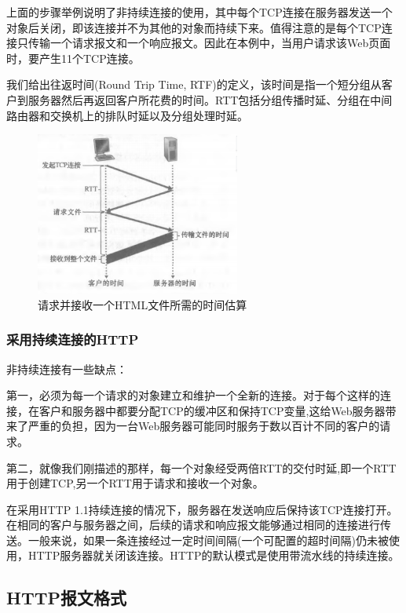     上面的步骤举例说明了非持续连接的使用，其中每个TCP连接在服务器发送一个对象后关闭，即该连接并不为其他的对象而持续下来。值得注意的是每个TCP连接只传输一个请求报文和一个响应报文。因此在本例中，当用户请求该Web页面时，要产生11个TCP连接。

    我们给出往返时间(Round Trip Time, RTF)的定义，该时间是指一个短分组从客户到服务器然后再返回客户所花费的时间。RTT包括分组传播时延、分组在中间路由器和交换机上的排队时延以及分组处理时延。

\begin{figure}[!htbp]
    \centering
    \includegraphics[width=0.6\textwidth]{image/chapter02/RTT.png}
    \caption{请求并接收一个HTML文件所需的时间估算}
\end{figure}

\subsubsection{采用持续连接的HTTP}

    非持续连接有一些缺点：
    
    第一，必须为每一个请求的对象建立和维护一个全新的连接。对于每个这样的连接，在客户和服务器中都要分配TCP的缓冲区和保持TCP变量,这给Web服务器带来了严重的负担，因为一台Web服务器可能同时服务于数以百计不同的客户的请求。

    第二，就像我们刚描述的那样，每一个对象经受两倍RTT的交付时延,即一个RTT用于创建TCP,另一个RTT用于请求和接收一个对象。

    在采用HTTP 1.1持续连接的情况下，服务器在发送响应后保持该TCP连接打开。在相同的客户与服务器之间，后续的请求和响应报文能够通过相同的连接进行传送。一般来说，如果一条连接经过一定时间间隔(一个可配置的超时间隔)仍未被使用，HTTP服务器就关闭该连接。HTTP的默认模式是使用带流水线的持续连接。

\subsection{HTTP报文格式}

